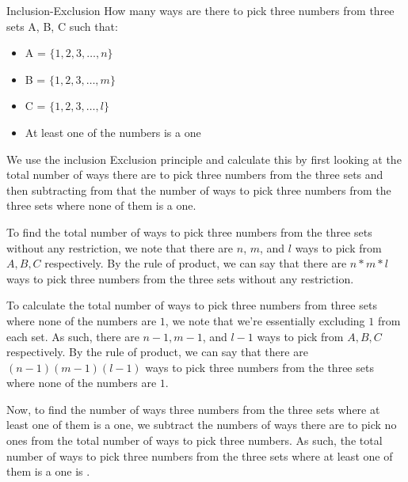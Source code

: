\documentclass[11pt, nopagenumbers]{adamblan-hw}
\begin{document}
\begin{question}{Inclusion-Exclusion}
How many ways are there to pick three numbers from three sets A, B, C such that:
\begin{itemize}
    \item A = $\{1, 2, 3, \dots, n\}$ 
    \item B = $\{1, 2, 3, \dots, m\}$
    \item C = $\{1, 2, 3, \dots, l\}$
    \item At least one of the numbers is a one
\end{itemize}
We use the inclusion Exclusion principle and calculate this by first looking at 
the total number of ways there are to pick three numbers from the three sets and
then subtracting from that the number of ways to pick three numbers from the three 
sets where none of them is a one.

To find the total number of ways to pick three numbers from the three sets without any restriction, we note
that there are $n$, $m$, and $l$ ways to pick from $A, B, C$ respectively. By the rule of product, 
we can say that there are $n * m * l$ ways to pick three numbers from the three sets without any restriction.

To calculate the total number of ways to pick three numbers from three sets where none of the numbers are $1$, 
we note that we're essentially excluding $1$ from each set. As such, there are $n - 1, m - 1$, and $l - 1$ ways
to pick from $A, B, C$ respectively. By the rule of product, we can say that there are $(n - 1)(m - 1)(l - 1)$ ways
to pick three numbers from the three sets where none of the numbers are $1$.

Now, to find the number of ways three numbers from the three sets where at least one of them is a one,
we subtract the numbers of ways there are to pick no ones from the total number of ways to pick three numbers.
As such, the total number of ways to pick three numbers from the three sets where at least one of them is a one
is .
\end{question}
\end{document}
